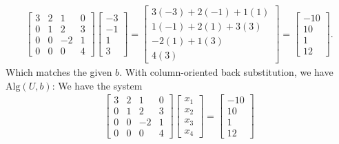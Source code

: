 \documentclass{report}
\begin{document}
    \begin{align*}
                    \begin{bmatrix}
                3 & 2 & 1 & 0 \\
                0 & 1 & 2 & 3 \\
                0 & 0 & -2 & 1 \\
                0 & 0 & 0 & 4
            \end{bmatrix}
            \begin{bmatrix}
                -3 \\ -1 \\ 1 \\ 3
            \end{bmatrix}
            = 
            \begin{bmatrix}
                3(-3) + 2(-1) + 1(1) \\
                1(-1) +2(1) +3(3) \\
                -2(1)+1(3) \\
                4(3)
            \end{bmatrix}
            =
            \begin{bmatrix}
                -10 \\
                10 \\
                1 \\
                12
            \end{bmatrix}
    .\end{align*}
    Which matches the given $b$. With column-oriented back substitution, we have
    \bigbreak \noindent 
    $\text{Alg}(U,b)$: We have the system
    \begin{align*}
        \begin{bmatrix}
            3 & 2 & 1 & 0 \\
            0 & 1 & 2 & 3 \\
            0 & 0 & -2 & 1 \\
            0 & 0 & 0 & 4
        \end{bmatrix}
        \begin{bmatrix}
            x_{1} \\
            x_{2} \\
            x_{3} \\
            x_{4}
        \end{bmatrix}
        =
        \begin{bmatrix}
            -10 \\
            10 \\
            1 \\
            12
        \end{bmatrix}
    \end{align*}
\end{document}
